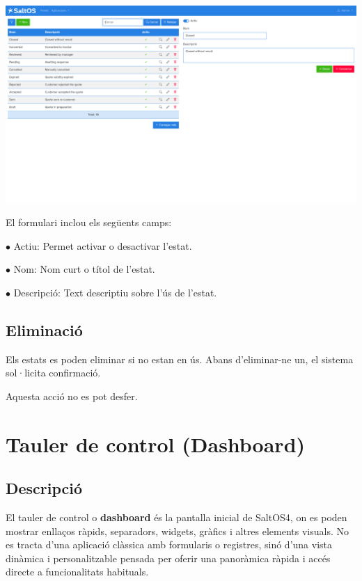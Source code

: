 \documentclass[a4paper]{article}
\begin{document}
\begin{center}\includegraphics[width=1\textwidth]{../ujest/snaps/test-screenshots-js-screenshots-crm-quotes-status-edit-10-ca-es-1-snap.png}\end{center}

El formulari inclou els següents camps:

\begin{compactitem}
\item[\color{myblue}$\bullet$] Actiu: Permet activar o desactivar l'estat.
\item[\color{myblue}$\bullet$] Nom: Nom curt o títol de l'estat.
\item[\color{myblue}$\bullet$] Descripció: Text descriptiu sobre l'ús de l'estat.
\end{compactitem}

\hypertarget{toc80}{}
\subsection{Eliminació}

Els estats es poden eliminar si no estan en ús.
Abans d'eliminar-ne un, el sistema sol·licita confirmació.

Aquesta acció no es pot desfer.


\hypertarget{toc81}{}
\section{Tauler de control (Dashboard)}

\hypertarget{toc82}{}
\subsection{Descripció}

El tauler de control o \textbf{dashboard} és la pantalla inicial de SaltOS4, on es poden mostrar enllaços ràpids, separadors, widgets, gràfics i altres elements visuals.
No es tracta d'una aplicació clàssica amb formularis o registres, sinó d'una vista dinàmica i personalitzable pensada per oferir una panoràmica ràpida i accés directe a funcionalitats habituals.
\end{document}
